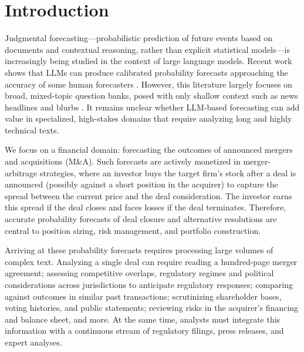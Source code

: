 \documentclass{article}
\theoremstyle{plain}
\theoremstyle{definition}
\theoremstyle{remark}
\begin{document}
\section{Introduction}



Judgmental forecasting---probabilistic prediction of future events based on documents and contextual reasoning, rather than explicit statistical models---is increasingly being studied in the context of large language models. Recent work shows that LLMs can produce calibrated probability forecasts approaching the accuracy of some human forecasters \cite{halawi2024approaching,schoen2024wisdom,alur2025aia}. However, this literature largely focuses on broad, mixed-topic question banks, posed with only shallow context such as news headlines and blurbs \cite{kargerforecastbench}. It remains unclear whether LLM-based forecasting can add value in specialized, high-stakes domains that require analyzing long and highly technical texts.

We focus on a financial domain: forecasting the outcomes of announced mergers and acquisitions (M\&A). Such forecasts are actively monetized in merger-arbitrage strategies, where an investor buys the target firm’s stock after a deal is announced (possibly against a short position in the acquirer) to capture the spread between the current price and the deal consideration. The investor earns this spread if the deal closes and faces losses if the deal terminates. Therefore, accurate probability forecasts of deal closure and alternative resolutions are central to position sizing, risk management, and portfolio construction. 


Arriving at these probability forecasts requires processing large volumes of complex text. Analyzing a single deal can require reading a hundred-page merger agreement; assessing competitive overlaps, regulatory regimes and political considerations across jurisdictions to anticipate regulatory responses; comparing against outcomes in similar past transactions; scrutinizing shareholder bases, voting histories, and public statements; reviewing risks in the acquirer’s financing and balance sheet, and more. At the same time, analysts must integrate this information with a continuous stream of regulatory filings, press releases, and expert analyses. 
\end{document}
